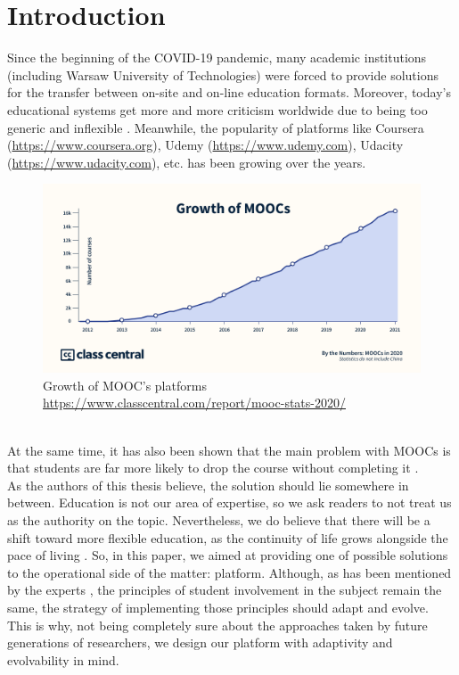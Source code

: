 \documentclass[a4paper,11pt,twoside]{report}
\theoremstyle{definition}
\begin{document}
\chapter*{Introduction}
Since the beginning of the COVID-19 pandemic, many academic institutions (including Warsaw University of Technologies) were forced to provide solutions for the transfer between on-site and on-line education formats. Moreover, today's educational systems get more and more criticism worldwide due to being too generic and inflexible \cite{onvsoff1}. Meanwhile, the popularity of platforms like Coursera (\href{https://www.coursera.org}{https://www.coursera.org}), Udemy (\href{https://www.udemy.com}{https://www.udemy.com}), Udacity (\href{https://www.udacity.com}{https://www.udacity.com}), etc. has been growing over the years. \\
\begin{figure}[hp]
\centering
    \begin{center}
        \includegraphics[scale=.4]{img/growth-2020.png}
          \caption{Growth of MOOC's platforms   \href{https://www.classcentral.com/report/mooc-stats-2020/}{https://www.classcentral.com/report/mooc-stats-2020/}\cite{growth}}
    \end{center}
\end{figure} \\
At the same time, it has also been shown that the main problem with MOOCs is that students are far more likely to drop the course without completing it \cite{dropout}. \\
As the authors of this thesis believe, the solution should lie somewhere in between. Education is not our area of expertise, so we ask readers to not treat us as the authority on the topic. Nevertheless, we do believe that there will be a shift toward more flexible education, as the continuity of life grows \cite{expectancy} alongside the pace of living \cite{pace}. So, in this paper, we aimed at providing one of possible solutions to the operational side of the matter: platform. Although, as has been mentioned by the experts \cite{harvard1}, the principles of student involvement in the subject remain the same, the strategy of implementing those principles should adapt and evolve. This is why, not being completely sure about the approaches taken by future generations of researchers, we design our platform with adaptivity and evolvability in mind. \\ 
\end{document}
